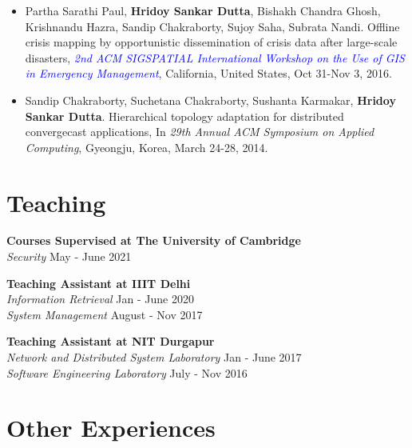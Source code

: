 \documentclass[margin, centered]{res}
\begin{document}
\begin{resume}
\begin{itemize}[leftmargin=*]
\item Partha Sarathi Paul, \textbf{Hridoy Sankar Dutta}, Bishakh Chandra Ghosh, Krishnandu Hazra, Sandip Chakraborty, Sujoy Saha, Subrata Nandi. Offline crisis mapping by opportunistic dissemination of crisis data after large-scale disasters, \textit{\textcolor{blue}{2nd ACM SIGSPATIAL International Workshop on the Use of GIS in Emergency Management}}, California, United States, Oct 31-Nov 3, 2016.

\item Sandip Chakraborty, Suchetana Chakraborty, Sushanta Karmakar, \textbf{Hridoy Sankar Dutta}. Hierarchical topology adaptation for distributed convergecast applications, In \textit{29th Annual ACM Symposium on Applied Computing}, Gyeongju, Korea, March 24-28, 2014.
\end{itemize}


\section{Teaching}
\textbf{Courses Supervised at The University of Cambridge} \\
\emph{Security} \hfill May - June 2021

\textbf{Teaching Assistant at IIIT Delhi} \\
\emph{Information Retrieval} \hfill Jan - June 2020 \\
\emph{System Management} \hfill August - Nov 2017


\textbf{Teaching Assistant at NIT Durgapur} \\
\emph{Network and Distributed System Laboratory} \hfill Jan - June 2017 \\
\emph{Software Engineering Laboratory} \hfill July - Nov 2016

\section{Other Experiences}


\end{resume}
\end{document}
